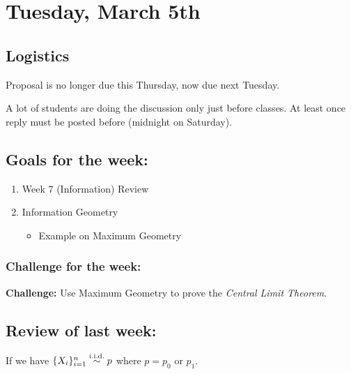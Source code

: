 \section{Tuesday, March 5th}
\subsection{Logistics}
Proposal is no longer due this Thursday, now due next Tuesday. 

A lot of students are doing the discussion only just before classes. At least once reply must be posted before (midnight on Saturday).

\subsection{Goals for the week:}
\begin{enumerate}
    \item Week 7 (Information) Review
    \item Information Geometry
    \begin{itemize}
        \item Example on Maximum Geometry
    \end{itemize}
\end{enumerate}
\subsubsection{Challenge for the week:}
\begin{important}
\textbf{Challenge:} Use Maximum Geometry to prove the \textit{Central Limit Theorem}.
\end{important}

\subsection{Review of last week:}
If we have $\{X_i\}_{i=1}^n\overset{\text{i.i.d.}}{\sim} p$ where $p = p_0$ or $p_1$.

